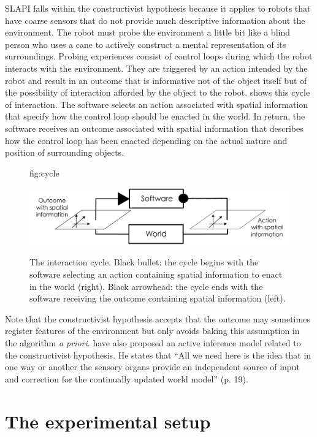 \documentclass[pmlr]{jmlr}%
\begin{document}
SLAPI falls within the constructivist hypothesis because it applies to robots that have coarse sensors that do not provide much descriptive information about the environment. 
The robot must probe the environment a little bit like a blind person who uses a cane to actively construct a mental representation of its surroundings. 
Probing experiences consist of control loops during which the robot interacts with the environment.   
They are triggered by an action intended by the robot and result in an outcome that is informative not of the object itself but of the possibility of interaction afforded by the object to the robot. 
 shows this cycle of interaction. 
The software selects an action associated with spatial information that specify how the control loop should be enacted in the world. 
In return, the software receives an outcome associated with spatial information that describes how the control loop has been enacted depending on the actual nature and position of surrounding objects. 


\begin{figure}[htbp]
	\floatconts
	{fig:cycle}
	{\caption{The interaction cycle. Black bullet: the cycle begins with the software selecting an action containing spatial information to enact in the world (right). Black arrowhead: the cycle ends with the software receiving the outcome containing spatial information (left).}}
	{\includegraphics[width=0.8\linewidth]{images/Figure_0_Cycle}}
\end{figure}

Note that the constructivist hypothesis accepts that the outcome may sometimes register features of the environment but only avoids baking this assumption in the algorithm \textit{a priori}. 
\cite{rudrauf_mathematical_2017} have also proposed an active inference model related to the constructivist hypothesis. He states that ``All we need here is the idea that in one way or another the sensory organs provide an independent source of input and correction for the continually updated world model'' (p. 19).

\section{The experimental setup}
\label{sec:experiment}
\end{document}
